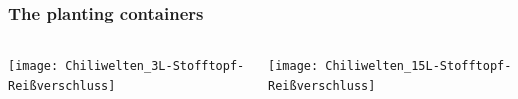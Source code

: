 \documentclass[
    12pt,
    aspectratio=1610,
    b,
    bibliography=../bibliography.bib,
    link-citations]{beamer}
\begin{document}
    \begin{frame}
        \frametitle{The planting containers}
        \tiny
        \begin{columns}[T]
            \begin{column}{.45\textwidth}
                \texttt{[image: Chiliwelten\_3L-Stofftopf-Reißverschluss]}
            \end{column}
            \begin{column}{.45\textwidth}
                \texttt{[image: Chiliwelten\_15L-Stofftopf-Reißverschluss]}
            \end{column}
        \end{columns}
    \end{frame}
\end{document}

